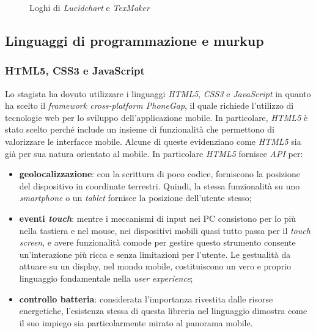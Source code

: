 \begin{figure}[!h] 
    \centering 
    \caption{Loghi di \textit{Lucidchart} e \textit{TexMaker}}
\end{figure}

\subsection{Linguaggi di programmazione e murkup}

\subsubsection{HTML5, CSS3 e JavaScript}

Lo stagista ha dovuto utilizzare i linguaggi \textit{HTML5}, \textit{CSS3} e \textit{JavaScript} in quanto ha scelto il \textit{framework cross-platform PhoneGap}, il quale richiede l'utilizzo di tecnologie web per lo sviluppo dell'applicazione mobile. In particolare, \textit{HTML5} è stato scelto perché include un insieme di funzionalità che permettono di valorizzare le interfacce mobile. Alcune di queste evidenziano come \textit{HTML5} sia già per sua natura orientato al mobile. In particolare \textit{HTML5} fornisce \textit{API} per:
\begin{itemize}
	\item \textbf{geolocalizzazione}: con la scrittura di poco codice, forniscono la posizione del dispositivo in coordinate terrestri. Quindi, la stessa funzionalità su uno \textit{smartphone} o un \textit{tablet} fornisce la posizione dell'utente stesso;
	\item \textbf{eventi \textit{touch}}: mentre i meccanismi di input nei PC consistono per lo più nella tastiera e nel mouse, nei dispositivi mobili quasi tutto passa per il \textit{touch screen}, e avere funzionalità comode per gestire questo strumento consente un'interazione più ricca e senza limitazioni per l'utente. Le gestualità da attuare su un display, nel mondo mobile, costituiscono un vero e proprio linguaggio fondamentale nella \textit{user experience};
	\item \textbf{controllo batteria}: considerata l'importanza rivestita dalle risorse energetiche, l'esistenza stessa di questa libreria nel linguaggio dimostra come il suo impiego sia particolarmente mirato al panorama mobile.
\end{itemize}


